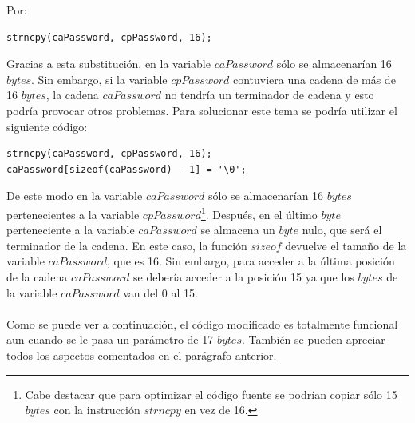 \documentclass [titlepage, 12pt]{article}
\begin{document}
Por:

\lstset{language=C++,caption=C\'odigo corregida,label=fig:funcionCorregida}
\begin{lstlisting}
strncpy(caPassword, cpPassword, 16);
\end{lstlisting} 

Gracias a esta substituci\'on, en la variable $caPassword$ s\'olo se almacenar\'ian 16 $bytes$. Sin embargo, si la variable $cpPassword$ contuviera una cadena de m\'as de 16 $bytes$, la cadena $caPassword$ no tendr\'ia un terminador de cadena y esto podr\'ia provocar otros problemas. Para solucionar este tema se podr\'ia utilizar el siguiente c\'odigo:

\lstset{language=C++,caption=C\'odigo mejorado,label=fig:codigoMejorado}
\begin{lstlisting}
strncpy(caPassword, cpPassword, 16);
caPassword[sizeof(caPassword) - 1] = '\0';
\end{lstlisting} 

De este modo en la variable $caPassword$ s\'olo se almacenar\'ian 16 $bytes$ pertenecientes a la variable $cpPassword$\footnote{Cabe destacar que para optimizar el c\'odigo fuente se podr\'ian copiar s\'olo 15 $bytes$ con la instrucci\'on $strncpy$ en vez de 16.}. Despu\'es, en el \'ultimo $byte$ perteneciente a la variable $caPassword$ se almacena un $byte$ nulo, que ser\'a el terminador de la cadena. En este caso, la funci\'on $sizeof$ devuelve el tama\~no de la variable $caPassword$, que es 16. Sin embargo, para acceder a la \'ultima posici\'on de la cadena $caPassword$ se deber\'ia acceder a la posici\'on 15 ya que los $bytes$ de la variable $caPassword$ van del 0 al 15.\\
\\
Como se puede ver a continuaci\'on, el c\'odigo modificado es totalmente funcional aun cuando se le pasa un par\'ametro de 17 $bytes$. Tambi\'en se pueden apreciar todos los aspectos comentados en el par\'agrafo anterior.
\end{document}

